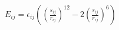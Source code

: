 \documentclass{article}
\begin{document}
\changefontsizes{20pt}
$E_{ij}=\epsilon_{ij}\left(\left(\frac{s_{ij}}{r_{ij}}\right)^{12}-2\left(\frac{s_{ij}}{r_{ij}}\right)^{6}\right)$
\end{document}
